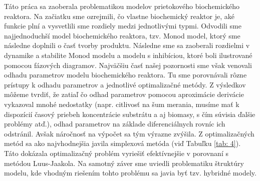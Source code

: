 Táto práca sa zaoberala problematikou modelov prietokového biochemického reaktora. Na začiatku sme ozrejmili, čo vlastne biochemický reaktor je, aké funkcie plní a vysvetlili sme rozdiely medzi jednotlivými typmi. Odvodili sme najjednoduchší model biochemického reaktora, tzv. Monod model, ktorý sme následne doplnili o časť tvorby produktu. Následne sme sa zaoberali rozdielmi v dynamike a stabilite Monod modelu a modelu s inhibíciou, ktoré boli ilustrované pomocou fázových diagramov. Najväčšiu časť našej pozornosti sme však venovali odhadu parametrov modelu biochemického reaktora. Tu sme porovnávali rôzne prístupy k odhadu parametrov a jednotlivé optimalizačné metódy. Z výsledkov môžeme tvrdiť, že zatiaľ čo odhad parametrov pomocou aproximácie derivácie vykazoval mnohé nedostatky (napr. citlivosť na šum merania, musíme mať k dispozícií časový priebeh koncentrácie substrátu a aj biomasy, s čím súvisia ďalšie problémy atď.), odhad parametrov na základe diferenciálnych rovníc ich odstránil. Avšak náročnosť na výpočet sa tým výrazne zvýšila. Z optimalizačných metód sa ako najvhodnejšia javila simplexová metóda (viď Tabuľku \ref{tab: 4}). Táto dokázala optimalizačný problém vyriešiť efektívnejšie v porovnaní s metódou Luus-Jaakola. Na samotný záver sme uviedli problematiku štruktúry modelu, kde vhodným riešením tohto problému sa javia byť tzv. hybridné modely. 
